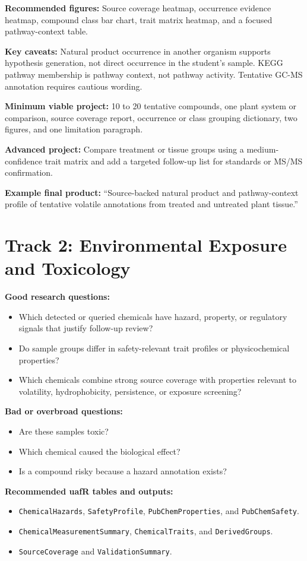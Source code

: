 \textbf{Recommended figures:} Source coverage heatmap, occurrence evidence heatmap, compound class bar chart, trait matrix heatmap, and a focused pathway-context table.

\textbf{Key caveats:} Natural product occurrence in another organism supports hypothesis generation, not direct occurrence in the student's sample. KEGG pathway membership is pathway context, not pathway activity. Tentative GC-MS annotation requires cautious wording.

\textbf{Minimum viable project:} 10 to 20 tentative compounds, one plant system or comparison, source coverage report, occurrence or class grouping dictionary, two figures, and one limitation paragraph.

\textbf{Advanced project:} Compare treatment or tissue groups using a medium-confidence trait matrix and add a targeted follow-up list for standards or MS/MS confirmation.

\textbf{Example final product:} ``Source-backed natural product and pathway-context profile of tentative volatile annotations from treated and untreated plant tissue.''

\section{Track 2: Environmental Exposure and Toxicology}
\textbf{Good research questions:}
\begin{itemize}
  \item Which detected or queried chemicals have hazard, property, or regulatory signals that justify follow-up review?
  \item Do sample groups differ in safety-relevant trait profiles or physicochemical properties?
  \item Which chemicals combine strong source coverage with properties relevant to volatility, hydrophobicity, persistence, or exposure screening?
\end{itemize}

\textbf{Bad or overbroad questions:}
\begin{itemize}
  \item Are these samples toxic?
  \item Which chemical caused the biological effect?
  \item Is a compound risky because a hazard annotation exists?
\end{itemize}

\textbf{Recommended uafR tables and outputs:}
\begin{itemize}
  \item \texttt{ChemicalHazards}, \texttt{SafetyProfile}, \texttt{PubChemProperties}, and \texttt{PubChemSafety}.
  \item \texttt{ChemicalMeasurementSummary}, \texttt{ChemicalTraits}, and \texttt{DerivedGroups}.
  \item \texttt{SourceCoverage} and \texttt{ValidationSummary}.
\end{itemize}

